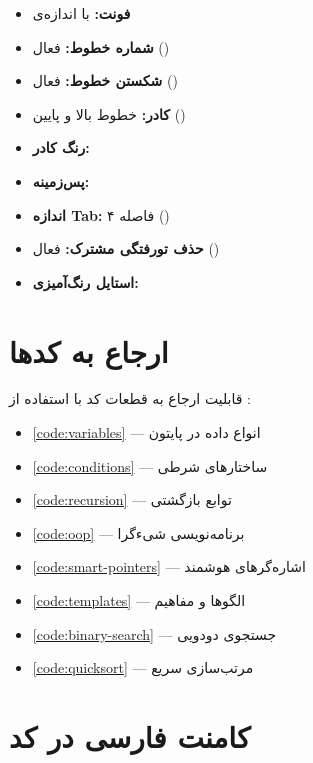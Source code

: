 \documentclass{matinbook}
\begin{document}
\begin{itemize}
    \item \textbf{فونت:}  با اندازه‌ی 
    \item \textbf{شماره خطوط:} فعال ()
    \item \textbf{شکستن خطوط:} فعال ()
    \item \textbf{کادر:} خطوط بالا و پایین ()
    \item \textbf{رنگ کادر:} 
    \item \textbf{پس‌زمینه:} 
    \item \textbf{اندازه Tab:} ۴ فاصله ()
    \item \textbf{حذف تورفتگی مشترک:} فعال ()
    \item \textbf{استایل رنگ‌آمیزی:} 
\end{itemize}


\section{ارجاع به کدها}
\label{sec:code-refs}

قابلیت ارجاع به قطعات کد با استفاده از :

\begin{itemize}
    \item \cref{code:variables} — انواع داده در پایتون
    \item \cref{code:conditions} — ساختارهای شرطی
    \item \cref{code:recursion} — توابع بازگشتی
    \item \cref{code:oop} — برنامه‌نویسی شیءگرا
    \item \cref{code:smart-pointers} — اشاره‌گرهای هوشمند 
    \item \cref{code:templates} — الگوها و مفاهیم 
    \item \cref{code:binary-search} — جستجوی دودویی
    \item \cref{code:quicksort} — مرتب‌سازی سریع
\end{itemize}

\section{کامنت فارسی در کد}
\label{sec:code-persian-comments}
\end{document}
